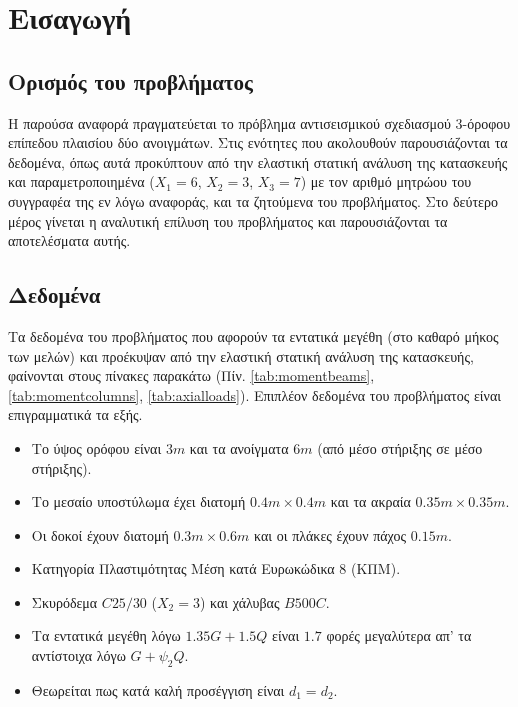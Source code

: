 \pagestyle{fancy}
\chapter{Εισαγωγή}
\section{Ορισμός του προβλήματος}
Η παρούσα αναφορά πραγματεύεται το πρόβλημα αντισεισμικού σχεδιασμού 3-όροφου επίπεδου πλαισίου δύο ανοιγμάτων. Στις ενότητες που ακολουθούν παρουσιάζονται τα δεδομένα, όπως αυτά προκύπτουν από την ελαστική στατική ανάλυση της κατασκευής και παραμετροποιημένα ($X_1 = 6$, $X_2 = 3$, $X_3 = 7$) με τον αριθμό μητρώου του συγγραφέα της εν λόγω αναφοράς, και τα ζητούμενα του προβλήματος. Στο δεύτερο μέρος γίνεται η αναλυτική επίλυση του προβλήματος και παρουσιάζονται τα αποτελέσματα αυτής.

\section{Δεδομένα}
Τα δεδομένα του προβλήματος που αφορούν τα εντατικά μεγέθη (στο καθαρό μήκος των μελών) και προέκυψαν από την ελαστική στατική ανάλυση της κατασκευής, φαίνονται στους πίνακες παρακάτω (Πίν. \ref{tab:momentbeams}, \ref{tab:momentcolumns}, \ref{tab:axialloads}). Επιπλέον δεδομένα του προβλήματος είναι επιγραμματικά τα εξής.

\begin{itemize}
  \item Το ύψος ορόφου είναι $3m$ και τα ανοίγματα $6m$ (από μέσο στήριξης σε μέσο στήριξης).
  \item Το μεσαίο υποστύλωμα έχει διατομή $0.4m\times0.4m$ και τα ακραία $0.35m\times0.35m$.
  \item Οι δοκοί έχουν διατομή $0.3m\times0.6m$ και οι πλάκες έχουν πάχος $0.15m$.
  \item Κατηγορία Πλαστιμότητας Μέση κατά Ευρωκώδικα $8$ (ΚΠΜ).
  \item Σκυρόδεμα $C25/30$ ($X_2 = 3$) και χάλυβας $B500C$.
  \item Τα εντατικά μεγέθη λόγω $1.35G+1.5Q$ είναι $1.7$ φορές
μεγαλύτερα απ' τα αντίστοιχα λόγω $G+\psi_2Q$.
  \item Θεωρείται πως κατά καλή προσέγγιση είναι $d_1 = d_2$.
\end{itemize}

